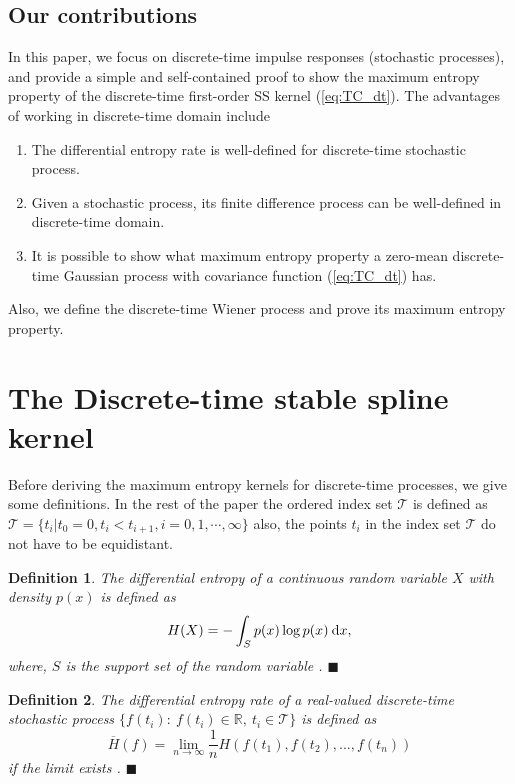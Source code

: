 \documentclass{article}
\newtheorem{mydef}{Definition}
\renewcommand{\d}{\:{\rm{d}}}
\begin{document}
\subsection{Our contributions}
In this paper, we focus on discrete-time impulse responses
(stochastic processes), and provide a simple and self-contained
proof to show  the maximum entropy property of the discrete-time
first-order SS kernel (\ref{eq:TC_dt}). The advantages of working in
discrete-time domain include
\begin{enumerate}
\item The differential entropy rate is well-defined for discrete-time stochastic process.\vspace{-3mm}
\item Given a stochastic process, its finite difference process can be well-defined in discrete-time domain.\vspace{-3mm}
\item It is possible to show what maximum entropy property a zero-mean discrete-time Gaussian process with covariance function (\ref{eq:TC_dt}) has.\vspace{-2mm}
\end{enumerate}
Also, we define the discrete-time Wiener process and prove its
maximum entropy property.

\section{The Discrete-time stable spline kernel}
\label{sec:DTmaxEnt} Before deriving the maximum entropy kernels for
discrete-time  processes, we give some definitions. In the
rest of the paper the ordered index set $\mathcal{T}$ is defined as
$\mathcal{T}=\{t_i| t_0=0,t_i<t_{i+1},i=0,1,\cdots,\infty\}$ also,
the points $t_i$ in the index set $\mathcal{T}$ do not have to be
equidistant.
\begin{mydef}
The differential entropy  of a continuous random variable $X$ with density $p(x)$ is defined as
\begin{equation}
H(X)=-\int_S{p(x)\log{p(x)}\d x},
\end{equation}
where, $S$ is the support set of the random variable \cite{Cover}. \hfill $\blacksquare$
\end{mydef}
\begin{mydef}
The differential entropy rate of a real-valued discrete-time
stochastic process $\{f(t_i):\ f(t_i)\in \mathbb{R},\  t_i \in
\mathcal{T}\}$
is defined as
\begin{equation}
\label{eq:defH}
\overline{H}(f)=\lim_{n\rightarrow\infty}\frac{1}{n} H(f(t_1),f(t_2),...,f(t_n))
\end{equation}
if the limit exists \cite{Cover}.    \hfill $\blacksquare$
\end{mydef}
\end{document}
